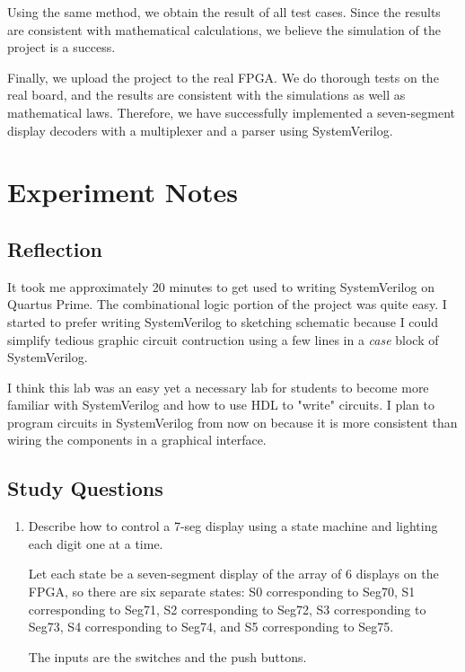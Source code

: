 \documentclass[12pt]{article}
\begin{document}
Using the same method, we obtain the result of all test cases. Since the results are consistent with mathematical calculations, we believe the simulation of the project is a success.

Finally, we upload the project to the real FPGA. We do thorough tests on the real board, and the results are consistent with the simulations as well as mathematical laws. Therefore, we have successfully implemented a seven-segment display decoders with a multiplexer and a parser using SystemVerilog.

\section{Experiment Notes}

\subsection*{Reflection}

It took me approximately 20 minutes to get used to writing SystemVerilog on Quartus Prime. The combinational logic portion of the project was quite easy. I started to prefer writing SystemVerilog to sketching schematic because I could simplify tedious graphic circuit contruction using a few lines in a \textit{case} block of SystemVerilog.

I think this lab was an easy yet a necessary lab for students to become more familiar with SystemVerilog and how to use HDL to "write" circuits. I plan to program circuits in SystemVerilog from now on because it is more consistent than wiring the components in a graphical interface.

\subsection*{Study Questions}

\begin{enumerate}
  \item Describe how to control a 7-seg display using a state machine and lighting each digit one at a time.

  Let each state be a seven-segment display of the array of 6 displays on the FPGA, so there are six separate states: S0 corresponding to Seg70, S1 corresponding to Seg71, S2 corresponding to Seg72, S3 corresponding to Seg73, S4 corresponding to Seg74, and S5 corresponding to Seg75.

  The inputs are the switches and the push buttons.
\end{enumerate}
\end{document}
